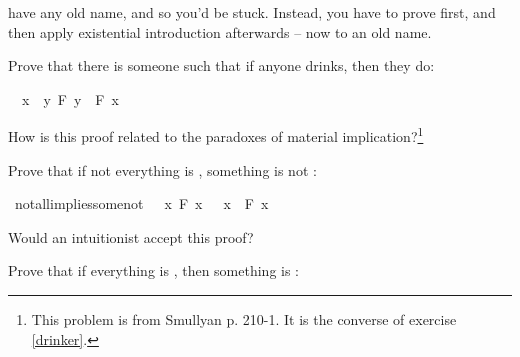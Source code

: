 \begin{isabellebody}
\begin{isamarkuptext}
have any old name, and so you'd be stuck. Instead, you have to prove  first, and
then apply existential introduction afterwards -- now to an old name.%
\end{isamarkuptext}\isamarkuptrue%
%
\begin{isamarkuptext}%
\begin{Exercise}[title = The Converse Drinkers Principle, label = conversedrinker]
Prove that there is someone such that if anyone drinks, then they do: \end{Exercise}%
\end{isamarkuptext}\isamarkuptrue%
\isamarkupfalse%
\ {\isachardoublequoteopen}{\isasymexists}\ x{\isachardot}\ {\isacharparenleft}{\isasymexists}\ y{\isachardot}\ F\ y{\isacharparenright}\ {\isasymlongrightarrow}\ F\ x{\isachardoublequoteclose}%
\isadelimproof
\ %
\endisadelimproof
%
\isatagproof
{}\isamarkupfalse%
%
\endisatagproof
{\isafoldproof}%
%
\isadelimproof
%
\endisadelimproof
%
\begin{isamarkuptext}%
How is this proof related to the paradoxes of material implication?\footnote{This problem is
from Smullyan \cite{smullyan_what_1978} p. 210-1. It is the converse of exercise \ref{drinker}.}%
\end{isamarkuptext}\isamarkuptrue%
%
\begin{isamarkuptext}%
\begin{Exercise}[label = demorgan] Prove that if not everything is , something is not : \end{Exercise}%
\end{isamarkuptext}\isamarkuptrue%
\isamarkupfalse%
\ not{\isacharunderscore}all{\isacharunderscore}implies{\isacharunderscore}some{\isacharunderscore}not{\isacharcolon}\ {\isachardoublequoteopen}{\isasymnot}\ {\isacharparenleft}{\isasymforall}\ x{\isachardot}\ F\ x{\isacharparenright}\ {\isasymlongrightarrow}\ {\isacharparenleft}{\isasymexists}\ x{\isachardot}\ {\isasymnot}\ F\ x{\isacharparenright}{\isachardoublequoteclose}%
\isadelimproof
\ %
\endisadelimproof
%
\isatagproof
{}\isamarkupfalse%
%
\endisatagproof
{\isafoldproof}%
%
\isadelimproof
%
\endisadelimproof
%
\begin{isamarkuptext}%
Would an intuitionist accept this proof?%
\end{isamarkuptext}\isamarkuptrue%
%
\begin{isamarkuptext}%
\begin{Exercise} Prove that if everything is , then something is : \end{Exercise}%

\end{isamarkuptext}
\end{isabellebody}
